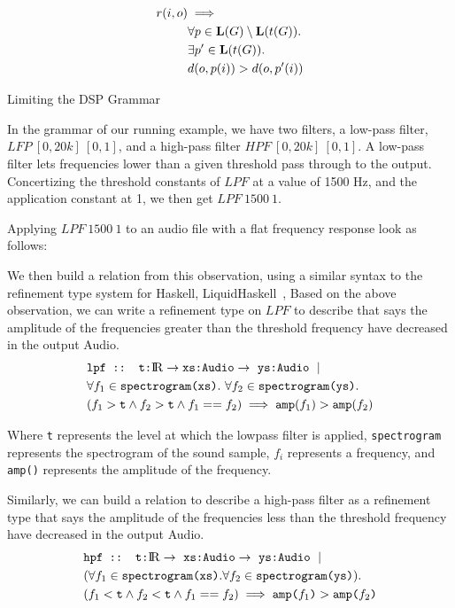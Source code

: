 \begin{align*}
   r(i,o) &\implies \\
   & \forall p \in \mathbf{L}(G) \setminus \mathbf{L}(t(G)). \\
   & \exists p' \in \mathbf{L}(t(G)). \\
   & {d}(o,p(i)) > {d}(o,p'(i)) 
\end{align*}

\begin{exmp} Limiting the DSP Grammar

In the grammar of our running example, we have two filters, a low-pass filter, $LFP \ [0,20k]\ [0,1]$, and a high-pass filter $HPF\ [0,20k]\ [0,1]$.
A low-pass filter lets frequencies lower than a given threshold pass through to the output.
Concertizing the threshold constants of $LPF$ at a value of 1500 Hz, and the application constant at 1, we then get $LPF \ 1500 \ 1$.

Applying $LPF \ 1500 \ 1$ to an audio file with a flat frequency response look as follows:


We then build a relation from this observation, using a similar syntax to the refinement type system for Haskell, LiquidHaskell~\cite{vazou2014refinement}, 
Based on the above observation, we can write a refinement type on $LPF$ to describe that says the amplitude of the frequencies greater than the threshold frequency have decreased in the output Audio.
%
\begin{align*}
  &\texttt{lpf :: t:\reals} \to  \texttt{xs:Audio} \to\ \texttt{ys:Audio}\ \mid \\
  &\forall f_1 \in  \texttt{spectrogram(xs)}.\ \forall f_2 \in \texttt{spectrogram(ys)}. \\
  &(f_1 > \texttt{t}  \land  f_2 > \texttt{t}  \land f_1 == f_2) \implies \texttt{amp}(f_1) > \texttt{amp}(f_2)
\end{align*}

Where \texttt{t} represents the level at which the lowpass filter is applied, \texttt{spectrogram} represents the spectrogram of the sound sample, $f_i$ represents a frequency, and \texttt{amp()} represents the amplitude of the frequency. 

Similarly, we can build a relation to describe a high-pass filter as a refinement type that says the amplitude of the frequencies less than the threshold frequency have decreased in the output Audio.
%
\begin{align*}
  &\texttt{hpf :: t:\reals} \to\ \texttt{xs:Audio} \to\ \texttt{ys:Audio}\ \mid \\
  &(\forall f_1 \in \texttt{spectrogram(xs)}. \forall f_2 \in \texttt{spectrogram(ys)}). \\
  &(f_1 < \texttt{t} \land f_2 < \texttt{t} \land f_1 == f_2) \implies \texttt{amp(}f_1\texttt{)} > \texttt{amp(} f_2 \texttt{)} 
\end{align*}


\end{exmp}
